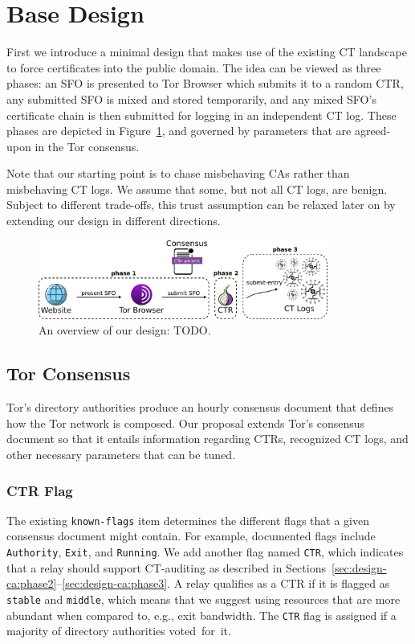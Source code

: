 \section{Base Design} \label{sec:design-ca}
First we introduce a minimal design that makes use of the existing CT landscape
to force certificates into the public domain.  The idea can be viewed as
three phases:
	an SFO is presented to Tor Browser which submits it to a random CTR,
	any submitted SFO is mixed and stored temporarily, and
	any mixed SFO's certificate chain is then submitted for logging in an
		independent CT log.
These phases are depicted in Figure~\ref{fig:design-ca}, and governed by
parameters that are agreed-upon in the Tor consensus.

Note that our starting point is to chase misbehaving CAs rather than
misbehaving CT logs.  We assume that some, but not all CT logs, are benign.
Subject to different trade-offs, this trust assumption can be relaxed later on
by extending our design in different directions.

\begin{figure}
	\centering
	\includegraphics[width=0.85\textwidth]{img/design-ca}
	\caption{An overview of our design: TODO. }
	\label{fig:design-ca}
\end{figure}

\subsection{Tor Consensus} \label{sec:design-ca:consensus}
Tor's directory authorities produce an hourly consensus document that defines
how the Tor network is composed.  Our proposal extends Tor's consensus document
so that it entails information regarding
	CTRs,
	recognized CT logs, and
	other necessary parameters that can be tuned.

\subsubsection{CTR Flag} \label{sec:design-ca:consensus:ctr-flag}
The existing \texttt{known-flags} item determines the different flags that a 
given consensus document might contain.  For example, documented flags include
\texttt{Authority}, \texttt{Exit}, and \texttt{Running}.  We add another flag
named \texttt{CTR}, which indicates that a relay should support CT-auditing as
described in Sections~\ref{sec:design-ca:phase2}--\ref{sec:design-ca:phase3}.  A
relay qualifies as a CTR if it is flagged as \texttt{stable} and
\texttt{middle}, which means that we suggest using resources that are more
abundant when compared to, e.g., exit bandwidth.  The \texttt{CTR} flag is
assigned if a majority of directory authorities voted~for~it.

